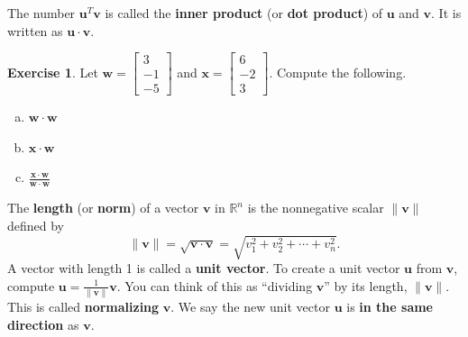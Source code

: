 \documentclass[10pt]{book}
\newcommand{\boxcolor}{gray!30}
\newenvironment{boxdef}{\begin{mdframed}[backgroundcolor=\boxcolor,linewidth=0pt,nobreak=true]}{\end{mdframed}}
\theoremstyle{definition}
\newtheorem{exercise}{Exercise}[section]
\newcommand{\R}{\mathbb{R}}
\newcommand{\vect}[1]{\ensuremath{\boldsymbol{\mathbf{#1}}}}
\begin{document}
\begin{boxdef}
	The number $\vect{u}^T\vect{v}$ is called the \textbf{inner product} (or \textbf{dot product}) of $\vect{u}$ and $\vect{v}$. It is written as $\vect{u}\cdot\vect{v}$.
\end{boxdef}


\begin{exercise} %
	Let $\vect{w}=\begin{bmatrix}3\\-1\\-5\end{bmatrix}$ and $\vect{x}=\begin{bmatrix}6\\-2\\3\end{bmatrix}$. Compute the following.
	\begin{multicols}{2}
		\begin{enumerate}[(a)]
			\item $\vect{w}\cdot\vect{w}$
			\vspace{5em}
			\item $\vect{x}\cdot\vect{w}$
			\columnbreak
			\item $\frac{\vect{x}\cdot\vect{w}}{\vect{w}\cdot\vect{w}}$
		\end{enumerate}
	\end{multicols}
	\vspace{5em}
\end{exercise}


\begin{boxdef}
	The \textbf{length} (or \textbf{norm}) of a vector $\vect{v}$ in $\R^n$ is the nonnegative scalar $\|\vect{v}\|$ defined by
	$$ \|\vect{v}\| = \sqrt{\vect{v}\cdot\vect{v}} = \sqrt{v_1^2+v_2^2+\cdots+v_n^2}. $$
	A vector with length 1 is called a \textbf{unit vector}. To create a unit vector $\vect{u}$ from $\vect{v}$, compute $\vect{u}=\frac{1}{\|\vect{v}\|}\vect{v}$. You can think of this as ``dividing $\vect{v}$'' by its length, $\|\vect{v}\|$. This is called \textbf{normalizing} $\vect{v}$. We say the new unit vector $\vect{u}$ is \textbf{in the same direction} as $\vect{v}$.
\end{boxdef}
\end{document}
